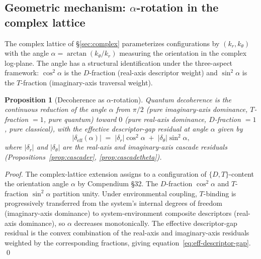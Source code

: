 \documentclass[11pt,a4paper]{article}
\newtheorem{proposition}[theorem]{Proposition}
\theoremstyle{definition}
\theoremstyle{remark}
\begin{document}
\subsection{Geometric mechanism: \texorpdfstring{$\alpha$-rotation}{alpha-rotation} in the complex lattice}\label{subsec:alpha-rotation}

The complex lattice of \S\ref{sec:complex} parameterizes configurations by $(k_{r}, k_{\theta})$ with the angle $\alpha = \arctan(k_{\theta}/k_{r})$ measuring the orientation in the complex log-plane. The angle has a structural identification under the three-aspect framework: $\cos^{2}\alpha$ is the $D$-fraction (real-axis descriptor weight) and $\sin^{2}\alpha$ is the $T$-fraction (imaginary-axis traversal weight).

\begin{proposition}[Decoherence as $\alpha$-rotation]\label{prop:alpha-rotation}
Quantum decoherence is the continuous reduction of the angle $\alpha$ from $\pi/2$ (pure imaginary-axis dominance, $T$-fraction $= 1$, pure quantum) toward $0$ (pure real-axis dominance, $D$-fraction $= 1$, pure classical), with the effective descriptor-gap residual at angle $\alpha$ given by
\begin{equation}\label{eq:eff-descriptor-gap}
|\delta_{\mathrm{eff}}(\alpha)| \;=\; |\delta_{r}|\cos^{2}\alpha \;+\; |\delta_{\theta}|\sin^{2}\alpha,
\end{equation}
where $|\delta_{r}|$ and $|\delta_{\theta}|$ are the real-axis and imaginary-axis cascade residuals (Propositions~\ref{prop:cascader}, \ref{prop:cascadetheta}).
\end{proposition}

\begin{proof}
The complex-lattice extension assigns to a configuration of $\{D,T\}$-content the orientation angle $\alpha$ by Compendium \S32. The $D$-fraction $\cos^{2}\alpha$ and $T$-fraction $\sin^{2}\alpha$ partition unity. Under environmental coupling, $T$-binding is progressively transferred from the system's internal degrees of freedom (imaginary-axis dominance) to system-environment composite descriptors (real-axis dominance), so $\alpha$ decreases monotonically. The effective descriptor-gap residual is the convex combination of the real-axis and imaginary-axis residuals weighted by the corresponding fractions, giving equation~\eqref{eq:eff-descriptor-gap}. \qed
\end{proof}
\end{document}
